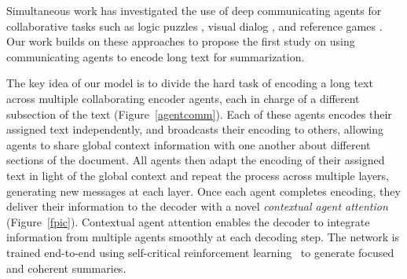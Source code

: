 \documentclass[11pt,a4paper]{article}
\newcommand{\yejin}[1]{{\color{cyan}yc:[#1]}}
\begin{document}
\begin{figure*}[t!]
\begin{center} 
\end{center} 
\vskip -0.25in
\caption{Multi-agent-encoder-decoder overview. Each agent  encodes a paragraph using a local encoder followed by multiple contextual layers with agent communication through concentrated messages  at each layer . \textbf{Communication is illustrated in Figure~\ref{fpicmessagepassing}}.
The word context vectors  are condensed into agent context . Agent specific generation probabilities, \textit{p}, enable voting for the suitable out-of-vocabulary words (e.g., '\textit{yen}') in the final distribution.}
\label{fpic}
\end{figure*}

Simultaneous work has investigated the use of deep communicating agents \cite{commnet} for collaborative tasks such as logic puzzles \cite{multiagent4}, visual dialog \cite{visualdialog}, and reference games \cite{multiagent2}. Our work builds on these approaches to propose the first study on using communicating agents to encode long text for summarization.





The key idea of our model is to divide the hard task of encoding a long text across multiple collaborating encoder agents, each in charge of a different subsection of the text (Figure~\ref{agentcomm}).
Each of these agents encodes their assigned text independently, and broadcasts their encoding to others, allowing agents to share global context information with one another about different sections of the document. All agents then adapt the encoding of their assigned text in light of the global context and repeat the process across multiple layers, generating new messages at each layer.
Once each agent completes encoding, they deliver their information to the decoder with a novel \textit{contextual agent attention} (Figure~\ref{fpic}). Contextual agent attention enables the decoder to integrate information from multiple agents smoothly at each decoding step.  
The network is trained end-to-end using
self-critical reinforcement learning~\cite{scic} to generate focused and coherent summaries. 
\begin{comment}
\yejin{``orchestrate'' is a high agency word, and some NLP reviewers seem to have almost an allergic reaction to overly animated NNs...}
\end{comment} 
\end{document}
